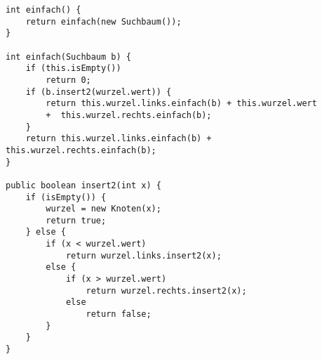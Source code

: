 \documentclass[a4paper, 10pt]{article}
\begin{document}
\begin{lstlisting}
int einfach() {
    return einfach(new Suchbaum());
}

int einfach(Suchbaum b) {
    if (this.isEmpty()) 
        return 0;
    if (b.insert2(wurzel.wert)) {
        return this.wurzel.links.einfach(b) + this.wurzel.wert 
        +  this.wurzel.rechts.einfach(b);
    }
    return this.wurzel.links.einfach(b) + this.wurzel.rechts.einfach(b);
}

public boolean insert2(int x) {
    if (isEmpty()) {
        wurzel = new Knoten(x);
        return true;
    } else {
        if (x < wurzel.wert)
            return wurzel.links.insert2(x);
        else {
            if (x > wurzel.wert)
                return wurzel.rechts.insert2(x);
            else 
                return false;
        }
    }
}
\end{lstlisting}
\end{document}
